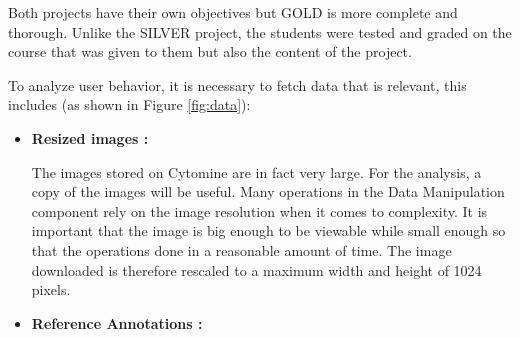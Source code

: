\documentclass[a4paper,11pt]{report}
\numberwithin{figure}{chapter} %
\begin{document}
		  Both projects have their own objectives but GOLD is more complete and thorough.
		  Unlike the SILVER project, the students were tested and graded on the course that was given to them but also the content of the project.

          To analyze user behavior, it is necessary to fetch data that is relevant, this includes (as shown in Figure \ref{fig:data}):

          \begin{itemize}
          \item[\textbullet] \textbf{Resized images :}\newline

          The images stored on Cytomine are in fact very large.
          For the analysis, a copy of the images will be useful.
          Many operations in the Data Manipulation component rely on the image resolution when it comes to complexity.
          It is important that the image is big enough to be viewable while small enough so that the operations done in a reasonable amount of time.
          The image downloaded is therefore rescaled to a maximum width and height of 1024 pixels.\\
          \item[\textbullet] \textbf{Reference Annotations :}\newline


\end{itemize}
\end{document}
